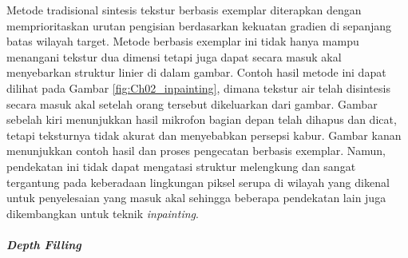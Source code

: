 Metode tradisional sintesis tekstur berbasis exemplar diterapkan dengan memprioritaskan urutan pengisian berdasarkan kekuatan gradien di sepanjang batas wilayah target\cite{b10}. 
Metode berbasis exemplar ini tidak hanya mampu menangani tekstur dua dimensi tetapi juga dapat secara masuk akal menyebarkan struktur linier di dalam gambar. Contoh hasil metode ini dapat dilihat pada Gambar \ref*{fig:Ch02_inpainting}, dimana tekstur air telah disintesis secara masuk akal setelah orang tersebut dikeluarkan dari gambar. Gambar sebelah kiri menunjukkan hasil mikrofon bagian depan telah dihapus dan dicat, tetapi teksturnya tidak akurat dan menyebabkan persepsi kabur. Gambar kanan menunjukkan contoh hasil dan proses pengecatan berbasis exemplar.
Namun, pendekatan ini tidak dapat mengatasi struktur melengkung dan sangat tergantung pada keberadaan lingkungan piksel serupa di wilayah yang dikenal untuk penyelesaian yang masuk akal sehingga beberapa pendekatan lain juga dikembangkan untuk teknik \textit{inpainting}.

\paragraph{\textit{Depth Filling}}
\label{paragraf: depth_filling}

